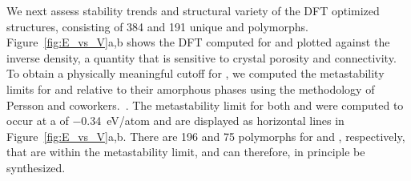 %
%
We next assess stability trends and structural variety of the DFT optimized structures, consisting of \num{384} and \num{191} unique \IrOtwo and \IrOthree polymorphs.
%
Figure~\ref{fig:E_vs_V}a,b shows the DFT computed \DHf for \IrOtwo and \IrOthree plotted against the inverse density,
a quantity that is sensitive to crystal porosity and connectivity.
%
To obtain a physically meaningful cutoff for \DHf, we computed the metastability limits for \IrOtwo and \IrOthree relative to their amorphous phases using the methodology of Persson and coworkers.~\cite{Aykol2018}.
%
The metastability limit for both \IrOtwo and \IrOthree were computed to occur at a \DHf of \SI{-0.34}{\electronvolt}/atom and are displayed as horizontal lines in Figure~\ref{fig:E_vs_V}a,b.
%
There are \num{196} and \num{75} polymorphs for \IrOtwo and \IrOthree, respectively, that are within the metastability limit, and can therefore, in principle be synthesized.



